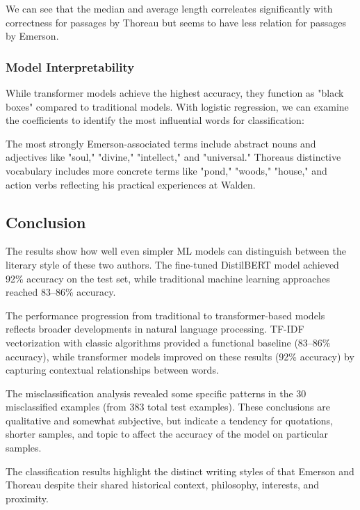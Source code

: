 \documentclass[
]{article}
\begin{document}
We can see that the median and average length correleates significantly
with correctness for passages by Thoreau but seems to have less relation
for passages by Emerson.

\subsubsection{Model Interpretability}\label{model-interpretability}

While transformer models achieve the highest accuracy, they function as
"black boxes" compared to traditional models. With logistic regression,
we can examine the coefficients to identify the most influential words
for classification:

The most strongly Emerson-associated terms include abstract nouns and
adjectives like "soul," "divine," "intellect," and "universal."
Thoreau\textquotesingle s distinctive vocabulary includes more concrete
terms like "pond," "woods," "house," and action verbs reflecting his
practical experiences at Walden.

\subsection{Conclusion}\label{conclusion}

The results show how well even simpler ML models can distinguish between the literary style of these two authors. The fine-tuned DistilBERT model achieved 92\% accuracy on the test set, while traditional machine learning approaches reached 83–86\% accuracy.

The performance progression from traditional to transformer-based models reflects broader developments in natural language processing. TF-IDF vectorization with classic algorithms provided a functional baseline (83–86\% accuracy), while transformer models improved on these results (92\% accuracy) by capturing contextual relationships between words.

The misclassification analysis revealed some specific patterns in the 30 misclassified examples (from 383 total test examples). These conclusions are qualitative and somewhat subjective, but indicate a tendency for quotations, shorter samples, and topic to affect the accuracy of the model on particular samples.

The classification results highlight the distinct writing styles of that Emerson and Thoreau despite their shared historical context, philosophy, interests, and proximity.
\end{document}
